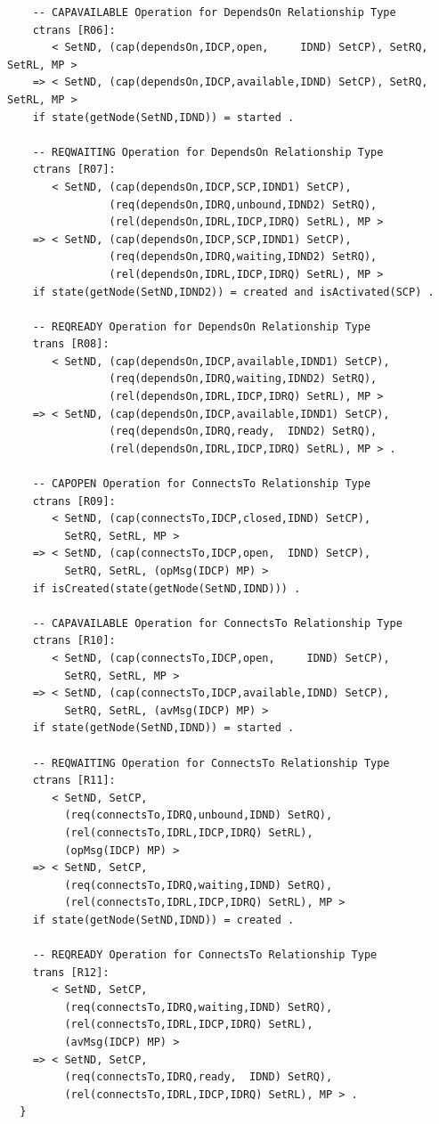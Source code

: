 \documentclass[12pt]{report}
\begin{document}
\begin{verbatim}
    -- CAPAVAILABLE Operation for DependsOn Relationship Type
    ctrans [R06]:
       < SetND, (cap(dependsOn,IDCP,open,     IDND) SetCP), SetRQ, SetRL, MP >
    => < SetND, (cap(dependsOn,IDCP,available,IDND) SetCP), SetRQ, SetRL, MP >
    if state(getNode(SetND,IDND)) = started .
  
    -- REQWAITING Operation for DependsOn Relationship Type
    ctrans [R07]:
       < SetND, (cap(dependsOn,IDCP,SCP,IDND1) SetCP), 
                (req(dependsOn,IDRQ,unbound,IDND2) SetRQ),
                (rel(dependsOn,IDRL,IDCP,IDRQ) SetRL), MP >
    => < SetND, (cap(dependsOn,IDCP,SCP,IDND1) SetCP), 
                (req(dependsOn,IDRQ,waiting,IDND2) SetRQ),
                (rel(dependsOn,IDRL,IDCP,IDRQ) SetRL), MP >
    if state(getNode(SetND,IDND2)) = created and isActivated(SCP) .
  
    -- REQREADY Operation for DependsOn Relationship Type
    trans [R08]:
       < SetND, (cap(dependsOn,IDCP,available,IDND1) SetCP), 
                (req(dependsOn,IDRQ,waiting,IDND2) SetRQ),
                (rel(dependsOn,IDRL,IDCP,IDRQ) SetRL), MP >
    => < SetND, (cap(dependsOn,IDCP,available,IDND1) SetCP), 
                (req(dependsOn,IDRQ,ready,  IDND2) SetRQ),
                (rel(dependsOn,IDRL,IDCP,IDRQ) SetRL), MP > .
  
    -- CAPOPEN Operation for ConnectsTo Relationship Type
    ctrans [R09]:
       < SetND, (cap(connectsTo,IDCP,closed,IDND) SetCP),
         SetRQ, SetRL, MP >
    => < SetND, (cap(connectsTo,IDCP,open,  IDND) SetCP),
         SetRQ, SetRL, (opMsg(IDCP) MP) >
    if isCreated(state(getNode(SetND,IDND))) .
  
    -- CAPAVAILABLE Operation for ConnectsTo Relationship Type
    ctrans [R10]:
       < SetND, (cap(connectsTo,IDCP,open,     IDND) SetCP),
         SetRQ, SetRL, MP >
    => < SetND, (cap(connectsTo,IDCP,available,IDND) SetCP),
         SetRQ, SetRL, (avMsg(IDCP) MP) >
    if state(getNode(SetND,IDND)) = started .
  
    -- REQWAITING Operation for ConnectsTo Relationship Type
    ctrans [R11]:
       < SetND, SetCP, 
         (req(connectsTo,IDRQ,unbound,IDND) SetRQ),
         (rel(connectsTo,IDRL,IDCP,IDRQ) SetRL), 
         (opMsg(IDCP) MP) >
    => < SetND, SetCP, 
         (req(connectsTo,IDRQ,waiting,IDND) SetRQ),
         (rel(connectsTo,IDRL,IDCP,IDRQ) SetRL), MP >
    if state(getNode(SetND,IDND)) = created .
  
    -- REQREADY Operation for ConnectsTo Relationship Type
    trans [R12]:
       < SetND, SetCP, 
         (req(connectsTo,IDRQ,waiting,IDND) SetRQ),
         (rel(connectsTo,IDRL,IDCP,IDRQ) SetRL), 
         (avMsg(IDCP) MP) >
    => < SetND, SetCP, 
         (req(connectsTo,IDRQ,ready,  IDND) SetRQ),
         (rel(connectsTo,IDRL,IDCP,IDRQ) SetRL), MP > .
  }
\end{verbatim}
\normalsize
\end{document}
